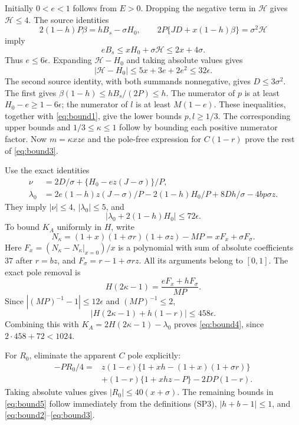 Initially $0<e<1$ follows from $E>0$. Dropping the negative term in
$\mathcal H$ gives $\mathcal H\le4$. The source identities
\[
 2(1-h)P\beta=hB_s-\sigma H_0,\qquad
 2P\{JD+x(1-h)\beta\}=\sigma^2\mathcal H
\]
imply
\[
 eB_s\le xH_0+\sigma\mathcal H\le2x+4\sigma.
\]
Thus $e\le6\epsilon$. Expanding $\mathcal H-H_0$ and taking absolute
values gives
\[
 |\mathcal H-H_0|\le5x+3e+2e^2\le32\epsilon.
\]
The second source identity, with both summands nonnegative, gives
$D\le3\sigma^2$. The first gives
$\beta(1-h)\le hB_s/(2P)\le h$. The numerator of $p$ is at least
$H_0-e\ge1-6\epsilon$; the numerator of $l$ is at least
$M(1-e)$. These inequalities, together with \eqref{eq:bound1}, give
the lower bounds $p,l\ge1/3$. The corresponding upper bounds and
$1/3\le\kappa\le1$ follow by bounding each positive numerator factor.
Now $m=\kappa xze$ and the pole-free expression for $C(1-r)$ prove
the rest of \eqref{eq:bound3}.

Use the exact identities
\begin{align*}
 \nu&=2D/\sigma+\{H_0-ez(J-\sigma)\}/P,\\
 \lambda_0&=2e(1-h)z(J-\sigma)/P
       -2(1-h)H_0/P+8Dh/\sigma-4bp\sigma z.
\end{align*}
They imply $|\nu|\le4$, $|\lambda_0|\le5$, and
\[
 |\lambda_0+2(1-h)H_0|\le72\epsilon.
\]
To bound $K_A$ uniformly in $H$, write
\[
 N_\kappa=(1+x)(1+\sigma r)(1+\sigma z)-MP
            =xF_x+\sigma F_\sigma.
\]
Here $F_x=(N_\kappa-N_\kappa|_{x=0})/x$ is a polynomial with sum of
absolute coefficients $37$ after $r=bz$, and
$F_\sigma=r-1+\sigma rz$. All its arguments belong to $[0,1]$.
The exact pole removal is
\[
 H(2\kappa-1)=\frac{eF_x+hF_\sigma}{MP}.
\]
Since $|(MP)^{-1}-1|\le12\epsilon$ and $(MP)^{-1}\le2$,
\[
 |H(2\kappa-1)+h(1-r)|\le458\epsilon.
\]
Combining this with $K_A=2H(2\kappa-1)-\lambda_0$ proves
\eqref{eq:bound4}, since $2\cdot458+72<1024$.

For $R_0$, eliminate the apparent $C$ pole explicitly:
\begin{align*}
 -PR_0/4={}&z(1-e)\{1+xh-(1+x)(1+\sigma r)\}\\
 &+(1-r)\{1+xhz-P\}-2DP(1-r).
\end{align*}
Taking absolute values gives $|R_0|\le40(x+\sigma)$.
The remaining bounds in \eqref{eq:bound5} follow immediately from
the definitions (SP3), $|h+b-1|\le1$, and \eqref{eq:bound2}--\eqref{eq:bound3}.

